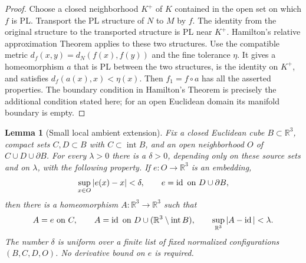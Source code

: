 \documentclass[11pt]{article}
\numberwithin{equation}{section}
\newtheorem{lemma}[theorem]{Lemma}
\theoremstyle{definition}
\theoremstyle{remark}
\newcommand{\R}{\mathbb R}
\newcommand{\Id}{\operatorname{id}}
\begin{document}
\begin{proof}
Choose a closed neighborhood $K^+$ of $K$ contained in the open set on
which $f$ is PL.  Transport the PL structure of $N$ to $M$ by $f$.
The identity from the original structure to the transported structure
is PL near $K^+$.  Hamilton's relative approximation Theorem
\cite[Section~3, Theorem~2.2, pp.~68--69]{Hamilton1976} applies to these
two structures.  Use the compatible metric
$d_f(x,y)=d_N(f(x),f(y))$ and the fine tolerance $\eta$.
It gives a homeomorphism $a$ that is PL between the two structures,
is the identity on $K^+$, and satisfies
$d_f(a(x),x)<\eta(x)$.  Then $f_1=f\circ a$ has all the asserted
properties.  The boundary condition in Hamilton's Theorem is precisely
the additional condition stated here; for an open Euclidean domain its
manifold boundary is empty.
\end{proof}

\begin{lemma}[Small local ambient extension]
\label{sm:local-extension}
Fix a closed Euclidean cube $B\subset\R^3$, compact sets $C,D\subset B$
with $C\subset\operatorname{int}B$, and an open neighborhood $O$ of
$C\cup D\cup\partial B$.  For every $\lambda>0$ there is a
$\delta>0$, depending only on these source sets and on $\lambda$,
with the following property.  If $e:O\to\R^3$ is an embedding,
\[
 \sup_{x\in O}|e(x)-x|<\delta,
 \qquad e=\Id\ \hbox{on }D\cup\partial B,
\]
then there is a homeomorphism $A:\R^3\to\R^3$ such that
\begin{equation}
 \label{sm:extension-conclusion}
 A=e\ \hbox{on }C,\qquad
 A=\Id\ \hbox{on }D\cup(\R^3\setminus\operatorname{int}B),
 \qquad \sup_{\R^3}|A-\Id|<\lambda.
\end{equation}
The number $\delta$ is uniform over a finite list of fixed normalized
configurations $(B,C,D,O)$.  No derivative bound on $e$ is required.
\end{lemma}
\end{document}
